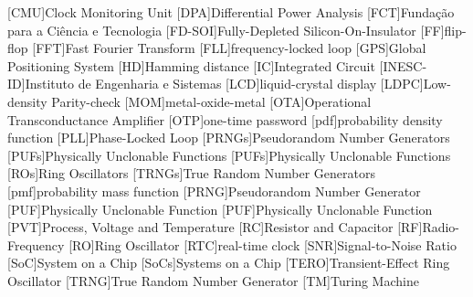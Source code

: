 [CMU]{Clock Monitoring Unit}
[DPA]{Differential Power Analysis}
[FCT]{Funda\c{c}\~ao para a Ci\^encia e Tecnologia}
[FD-SOI]{Fully-Depleted Silicon-On-Insulator}
[FF]{flip-flop}
[FFT]{Fast Fourier Transform}
[FLL]{frequency-locked loop}
[GPS]{Global Positioning System}
[HD]{Hamming distance}
[IC]{Integrated Circuit}
[INESC-ID]{Instituto de Engenharia e Sistemas}
[LCD]{liquid-crystal display}
[LDPC]{Low-density Parity-check}
[MOM]{metal-oxide-metal}
[OTA]{Operational Transconductance Amplifier}
[OTP]{one-time password}
[pdf]{probability density function}
[PLL]{Phase-Locked Loop}
[PRNGs]{Pseudorandom Number Generators}
[PUFs]{Physically Unclonable Functions }
[PUFs]{Physically Unclonable Functions}
[ROs]{Ring Oscillators}
[TRNGs]{True Random Number Generators}
[pmf]{probability mass function}
[PRNG]{Pseudorandom Number Generator}
[PUF]{Physically Unclonable Function }
[PUF]{Physically Unclonable Function}
[PVT]{Process, Voltage and Temperature}
[RC]{Resistor and Capacitor}
[RF]{Radio-Frequency}
[RO]{Ring Oscillator}
[RTC]{real-time clock}
[SNR]{Signal-to-Noise Ratio}
[SoC]{System on a Chip}
[SoCs]{Systems on a Chip}
[TERO]{Transient-Effect Ring Oscillator}
[TRNG]{True Random Number Generator}
[TM]{Turing Machine}
